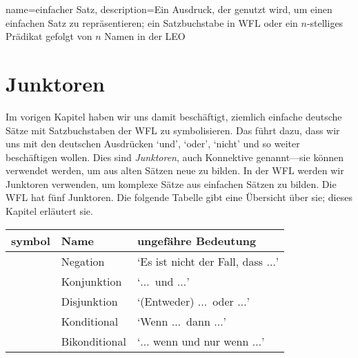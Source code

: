 
{
name=einfacher Satz,
description={Ein Ausdruck, der genutzt wird, um einen einfachen Satz zu repräsentieren; ein Satzbuchstabe in WFL oder ein $n$-stelliges Prädikat gefolgt von $n$ Namen in der LEO}
}


\chapter{Junktoren}
\label{s:TFLConnectives}

Im vorigen Kapitel haben wir uns damit beschäftigt, ziemlich einfache deutsche Sätze mit Satzbuchstaben der WFL zu symbolisieren. Das führt dazu, dass wir uns mit den deutschen Ausdrücken `und', `oder', `nicht' und so weiter beschäftigen wollen. Dies sind \emph{Junktoren}, auch Konnektive genannt---sie können verwendet werden, um aus alten Sätzen neue zu bilden. In der WFL werden wir Junktoren verwenden, um komplexe Sätze aus einfachen Sätzen zu bilden. Die WFL hat fünf Junktoren. Die folgende Tabelle gibt eine Übersicht über sie; dieses Kapitel erläutert sie.

	\begin{table}[h]
	\center
	\begin{tabular}{l l l}
	
	\textbf{symbol}&\textbf{Name}&\textbf{ungefähre Bedeutung}\\
	\hline
	\enot&Negation&`Es ist nicht der Fall, dass $\ldots$'\\
	\eand&Konjunktion&`$\ldots$\ und $\ldots$'\\
	\eor&Disjunktion&`(Entweder) $\ldots$\ oder $\ldots$'\\ %
	\eif&Konditional&`Wenn $\ldots$\ dann $\ldots$'\\
	\eiff&Bikonditional&`$\ldots$ wenn und nur wenn $\ldots$'\\
	
	\end{tabular}
	\end{table}

